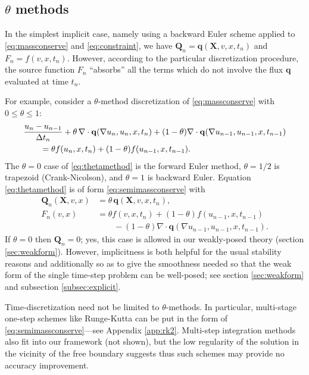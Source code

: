 \documentclass[final,leqno,onefignum,onetabnum]{siamltex1213bueler}
\newcommand\bq{\mathbf{q}}
\newcommand\bQ{\mathbf{Q}}
\newcommand\bX{\mathbf{X}}
\newcommand{\Div}{\nabla\cdot}
\renewcommand{\grad}{\nabla}
\begin{document}
\subsection{$\theta$ methods}  \label{subsec:thetamethods}  In the simplest implicit case, namely using a backward Euler scheme applied to \eqref{eq:massconserve} and \eqref{eq:constraint}, we have $\bQ_n = \bq(\bX,v,x,t_n)$ and $F_n = f(v,x,t_n)$.  However, according to the particular discretization procedure, the source function $F_n$ ``absorbs'' all the terms which do not involve the flux $\bq$ evaluated at time $t_n$.

For example, consider a $\theta$-method discretization \cite{MortonMayers2005} of \eqref{eq:massconserve} with $0\le \theta \le 1$:
\begin{align}
  &\frac{u_n - u_{n-1}}{\Delta t_n} + \theta\, \Div \bq(\grad u_n,u_n,x,t_n) + (1-\theta) \Div \bq(\grad u_{n-1},u_{n-1},x,t_{n-1}) \label{eq:thetamethod} \\
  &\qquad =  \theta f(u_n,x,t_n) + (1-\theta) f(u_{n-1},x,t_{n-1}). \notag
\end{align}
The $\theta=0$ case of \eqref{eq:thetamethod} is the forward Euler method, $\theta=1/2$ is trapezoid (Crank-Nicolson), and $\theta=1$ is backward Euler.  Equation \eqref{eq:thetamethod} is of form \eqref{eq:semimassconserve} with
\begin{align*}
\bQ_n(\bX,v,x) &= \theta\, \bq(\bX,v,x,t_n), \\
F_n(v,x)       &= \theta f(v,x,t_n) + (1-\theta) f(u_{n-1},x,t_{n-1}) \\
               &\qquad - (1-\theta) \Div \bq(\grad u_{n-1},u_{n-1},x,t_{n-1}).
\end{align*}
If $\theta=0$ then $\bQ_n=0$; yes, this case is allowed in our weakly-posed theory (section \ref{sec:weakform}).  However, implicitness is both helpful for the usual stability reasons \cite{MortonMayers2005} and additionally so as to give the smoothness needed so that the weak form of the single time-step problem can be well-posed; see section \ref{sec:weakform} and subsection \ref{subsec:explicit}.

Time-discretization need not be limited to $\theta$-methods.  In particular, multi-stage one-step schemes like Runge-Kutta can be put in the form of \eqref{eq:semimassconserve}---see Appendix \ref{app:rk2}.  Multi-step integration methods also fit into our framework (not shown), but the low regularity of the solution in the vicinity of the free boundary suggests thus such schemes may provide no accuracy improvement.
\end{document}
